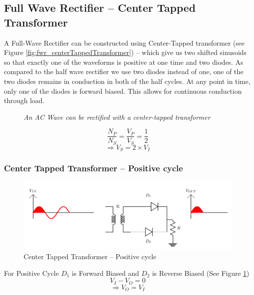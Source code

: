 		\subsection{Full Wave Rectifier – Center Tapped Transformer}
			A Full-Wave Rectifier can be constructed using Center-Tapped transformer (see Figure \ref{fig:fwr_centerTappedTransformer}) – which give us two shifted sinusoids so that exactly one of the waveforms is positive at one time and two diodes. As compared to the half wave rectifier we use two diodes instead of one, one of the two diodes remains in conduction in both of the half cycles. At any point in time, only one of the diodes is forward biased. This allows for continuous conduction through load.
			\begin{figure}[ht]
				\centering 
				\hfill
				\caption{\textit{An AC Wave can be rectified with a center-tapped transformer}}
			\end{figure}
			$$\frac{N_P}{N_S}=\frac{V_P}{V_S}=\frac{1}{2}$$
			$$\Rightarrow V_S=2 \times V_I$$
			
			\subsubsection{Center Tapped Transformer – Positive cycle}
				\begin{figure}[h]
					\centering
					\includegraphics[width=0.9\linewidth]{img/exp7/12}
					\caption{Center Tapped Transformer – Positive cycle}
					\label{fig:fwr_centerTappedTranformer_positiveCycle}
				\end{figure}
				For Positive Cycle \(D_1\) is Forward Biased and \(D_2\) is Reverse Biased (See Figure \ref{fig:fwr_centerTappedTranformer_positiveCycle})
				$$V_I - V_O=0$$
				$$\Rightarrow V_O=V_I$$
				
